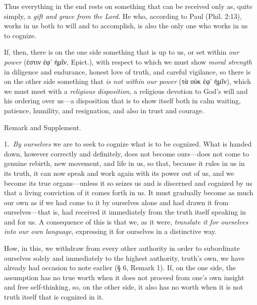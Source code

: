 \documentclass[12pt,a4paper]{book}
\begin{document}
Thus everything in the end rests on something that can be received only as, quite simply, a
\emph{gift and grace from the Lord}. He who, according to Paul (Phil. 2:13), works in us both to
will and to accomplish, is also the only one who works in us to cognize.

If, then, there is on the one side something that is up to us, or set within \emph{our power}
(ἐστιν ἐφ' ἡμῖν, Epict.), with respect to which we must show \emph{moral strength} in diligence
and endurance, honest love of truth, and careful vigilance, so there is on the other side
something that \emph{is not within our power} (τὰ οὐκ ἐφ' ἡμῖν), which we must meet with a
\emph{religious disposition}, a religious devotion to God's will and his ordering over us---a
disposition that is to show itself both in calm waiting, patience, humility, and resignation, and
also in trust and courage.

\begin{center}Remark and Supplement.\end{center}
1.~\emph{By ourselves} we are to seek to cognize what is to be cognized. What is handed down,
however correctly and definitely, does not become ours---does not come to genuine rebirth, new
movement, and life in us, so that, because it rules in us in its truth, it can now speak and work
again with its power out of us, and we become its true organs---unless it so seizes us and is
discerned and cognized by us that a living conviction of it comes forth in us. It must gradually
become as much our own as if we had come to it by ourselves alone and had drawn it from
ourselves---that is, had received it immediately from the truth itself speaking in and for us. A
consequence of this is that we, as it were, \emph{translate it for ourselves into our own language},
expressing it for ourselves in a distinctive way.

How, in this, we withdraw from every other authority in order to subordinate ourselves solely and
immediately to the highest authority, truth's own, we have already had occasion to note earlier
(§ 6, Remark 1). If, on the one side, the assumption has no true worth when it does not proceed
from one's own insight and free self-thinking, so, on the other side, it also has no worth when it
is not truth itself that is cognized in it.
\end{document}
